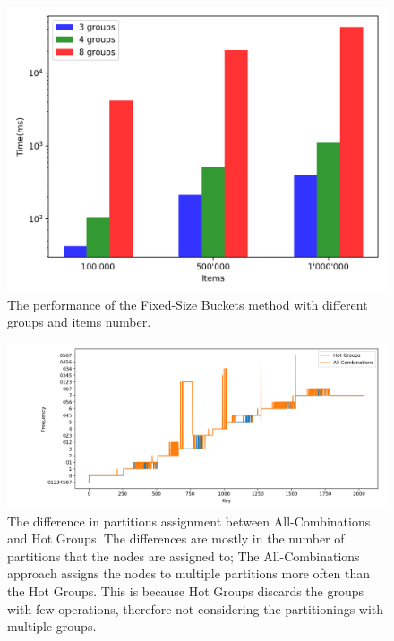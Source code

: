 \begin{figure}[!htb]
  \centering
  \includegraphics[width=\textwidth,height=\textheight,keepaspectratio]{img/hot.png}
  \caption[caption]{The performance of the Fixed-Size Buckets method with different groups and items number.}
  \label{fig:hot}
\end{figure}

\begin{figure}[!htb]
  \centering
  \includegraphics[width=\textwidth,height=\textheight,keepaspectratio]{img/partition_difference_hot_all.png}
  \caption[caption]{The difference in partitions assignment between All-Combinations and Hot Groups. The differences are mostly in the number of partitions that the nodes are assigned to; The All-Combinations approach assigns the nodes to multiple partitions more often than the Hot Groups. This is because Hot Groups discards the groups with few operations, therefore not considering the partitionings with multiple groups.}
  \label{fig:hot}
\end{figure}

